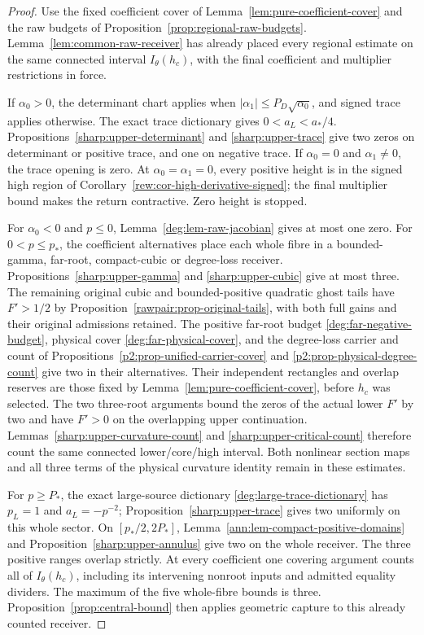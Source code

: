 \begin{proof}
Use the fixed coefficient cover of Lemma~\ref{lem:pure-coefficient-cover}
and the raw budgets of Proposition~\ref{prop:regional-raw-budgets}.
Lemma~\ref{lem:common-raw-receiver} has already placed every regional estimate
on the same connected interval \(I_\theta(h_c)\), with the final
coefficient and multiplier restrictions in force.

If \(\alpha_0>0\), the determinant chart applies when
\(|\alpha_1|\le P_D\sqrt{\alpha_0}\), and signed trace applies
otherwise. The exact trace dictionary gives
\(0<a_L<a_*/4\). Propositions~\ref{sharp:upper-determinant}
and \ref{sharp:upper-trace} give two zeros on determinant or positive
trace, and one on negative trace. If \(\alpha_0=0\) and
\(\alpha_1\ne0\), the trace opening is zero. At
\(\alpha_0=\alpha_1=0\), every positive height is in the signed high
region of Corollary~\ref{rew:cor-high-derivative-signed}; the final
multiplier bound makes the return contractive. Zero height is stopped.

For \(\alpha_0<0\) and \(p\le0\),
Lemma~\ref{deg:lem-raw-jacobian} gives at most one zero.
For \(0<p\le p_*\), the coefficient alternatives place each whole
fibre in a bounded-gamma, far-root, compact-cubic or degree-loss receiver.
Propositions~\ref{sharp:upper-gamma} and \ref{sharp:upper-cubic}
give at most three.
The remaining original cubic and bounded-positive quadratic ghost tails
have \(F'>1/2\) by Proposition~\ref{rawpair:prop-original-tails},
with both full gains and their original admissions retained.
The positive far-root budget
\eqref{deg:far-negative-budget}, physical cover
\eqref{deg:far-physical-cover}, and the degree-loss carrier and count
of Propositions~\ref{p2:prop-unified-carrier-cover} and
\ref{p2:prop-physical-degree-count} give two in their alternatives.
Their independent rectangles and overlap reserves are those fixed by
Lemma~\ref{lem:pure-coefficient-cover}, before \(h_c\) was selected.
The two three-root arguments bound the zeros of the actual lower \(F'\)
by two and have \(F'>0\) on the overlapping upper continuation.
Lemmas~\ref{sharp:upper-curvature-count} and
\ref{sharp:upper-critical-count} therefore count the same connected
lower/core/high interval. Both nonlinear section maps and all three
terms of the physical curvature identity remain in these estimates.

For \(p\ge P_*\), the exact large-source dictionary
\eqref{deg:large-trace-dictionary} has \(p_L=1\) and
\(a_L=-p^{-2}\); Proposition~\ref{sharp:upper-trace} gives two
uniformly on this whole sector. On \([p_*/2,2P_*]\),
Lemma~\ref{ann:lem-compact-positive-domains} and
Proposition~\ref{sharp:upper-annulus} give two on the whole receiver.
The three positive ranges overlap strictly. At every coefficient one
covering argument counts all of \(I_\theta(h_c)\), including its
intervening nonroot inputs and admitted equality dividers. The maximum
of the five whole-fibre bounds is three. Proposition~\ref{prop:central-bound}
then applies geometric capture to this already counted receiver.
\end{proof}
